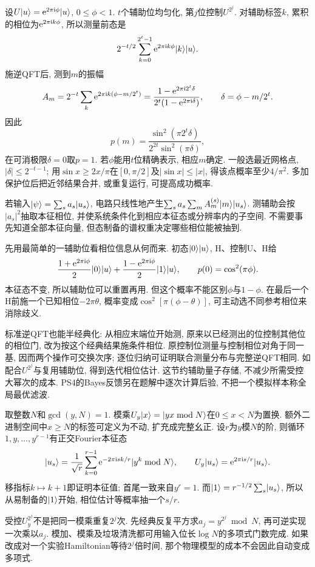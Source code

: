 设$U\lvert u\rangle=\mathrm e^{2\pi\mathrm i\phi}\lvert u\rangle$, $0\le\phi<1$. $t$个辅助位均匀化, 第$j$位控制$U^{2^j}$. 对辅助标签$k$, 累积的相位为$\mathrm e^{2\pi\mathrm i k\phi}$, 所以测量前态是
\[2^{-t/2}\sum_{k=0}^{2^t-1}\mathrm e^{2\pi\mathrm i k\phi}\lvert k\rangle\lvert u\rangle.\]
施逆QFT后, 测到$m$的振幅
\[A_m=2^{-t}\sum_k\mathrm e^{2\pi\mathrm i k(\phi-m/2^t)}
=\frac{1-\mathrm e^{2\pi\mathrm i2^t\delta}}{2^t(1-\mathrm e^{2\pi\mathrm i\delta})},\qquad\delta=\phi-m/2^t.\]
因此
\[p(m)=\frac{\sin^2(\pi2^t\delta)}{2^{2t}\sin^2(\pi\delta)},\]
在可消极限$\delta=0$取$p=1$. 若$\phi$能用$t$位精确表示, 相应$m$确定. 一般选最近网格点, $|\delta|\le2^{-t-1}$; 用$\sin x\ge2x/\pi$在$[0,\pi/2]$及$|\sin x|\le|x|$, 得该点概率至少$4/\pi^2$. 多加保护位后把近邻结果合并, 或重复运行, 可提高成功概率.

若输入$\lvert \psi\rangle=\sum_sa_s\lvert u_s\rangle$, 电路只线性地产生$\sum_sa_s\sum_mA_m^{(s)}\lvert m\rangle\lvert u_s\rangle$. 测辅助会按$|a_s|^2$抽取本征相位, 并使系统条件化到相应本征态或分辨率内的子空间. 不需要事先知道全部本征向量, 但态制备的谱权重决定哪些相位能被抽到.

先用最简单的一辅助位看相位信息从何而来. 初态$\lvert 0\rangle\lvert u\rangle$, H、控制U、H给
\[\frac{1+\mathrm e^{2\pi\mathrm i\phi}}2\lvert 0\rangle\lvert u\rangle+
\frac{1-\mathrm e^{2\pi\mathrm i\phi}}2\lvert 1\rangle\lvert u\rangle,\qquad p(0)=\cos^2(\pi\phi).\]
本征态不变, 所以辅助位可以重置再用. 但这个概率不能区别$\phi$与$1-\phi$. 在最后一个H前施一个已知相位$-2\pi\theta$, 概率变成$\cos^2[\pi(\phi-\theta)]$, 可主动选不同参考相位来消除歧义.

标准逆QFT也能半经典化: 从相应末端位开始测, 原来以已经测出的位控制其他位的相位门, 改为按这个经典结果施条件相位. 原控制位测量与控制相位对角于同一基, 因而两个操作可交换次序; 逐位归纳可证明联合测量分布与完整逆QFT相同. 如配合$U^{2^j}$与复用辅助位, 得到迭代相位估计. 这节约辅助量子存储, 不减少所需受控大幂次的成本. PS4的Bayes反馈另在题解中逐次计算后验, 不把一个模拟样本称全局最优滤波.

取整数$N$和$\gcd(y,N)=1$. 模乘$U_y\lvert x\rangle=\lvert yx\bmod N\rangle$在$0\le x<N$为置换. 额外二进制空间中$x\ge N$的标签可定义为不动, 扩充成完整幺正. 设$r$为$y$模$N$的阶, 则循环$1,y,\ldots,y^{r-1}$有正交Fourier本征态
\[\lvert u_s\rangle=\frac1{\sqrt r}\sum_{k=0}^{r-1}\mathrm e^{-2\pi\mathrm i sk/r}\lvert y^k\bmod N\rangle,\qquad
U_y\lvert u_s\rangle=\mathrm e^{2\pi\mathrm i s/r}\lvert u_s\rangle.\]
移指标$k\mapsto k+1$即证明本征值; 首尾一致来自$y^r=1$. 而$\lvert 1\rangle=r^{-1/2}\sum_s\lvert u_s\rangle$, 所以从易制备的$\lvert 1\rangle$开始, 相位估计等概率抽一个$s/r$.

受控$U_y^{2^j}$不是把同一模乘重复$2^j$次. 先经典反复平方求$a_j=y^{2^j}\bmod N$, 再可逆实现一次乘以$a_j$. 模加、模乘及垃圾清洗都可用输入位长$\log N$的多项式门数完成. 如果改成对一个实验Hamiltonian等待$2^j$倍时间, 那个物理模型的成本不会因此自动变成多项式.


